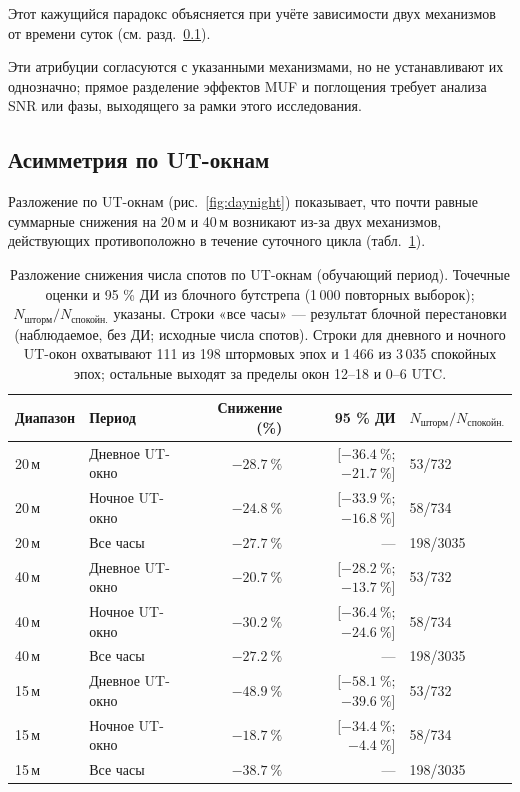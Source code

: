 \documentclass{agujournal2019}
\begin{document}
Этот кажущийся парадокс объясняется при учёте зависимости двух механизмов
от времени суток (см. разд.~\ref{sec:daynight}).

Эти атрибуции согласуются с указанными механизмами, но не устанавливают
их однозначно; прямое разделение эффектов MUF и поглощения требует анализа
SNR или фазы, выходящего за рамки этого исследования.

\subsection{Асимметрия по UT-окнам}
\label{sec:daynight}

Разложение по UT-окнам (рис.~\ref{fig:daynight}) показывает, что почти
равные суммарные снижения на 20\,м и 40\,м возникают из-за двух
механизмов, действующих противоположно в течение суточного цикла
(табл.~\ref{tab:daynight}).

\begin{table}[h]
	\centering
	\small
	\setlength{\tabcolsep}{4pt}
	\caption{Разложение снижения числа спотов по UT-окнам
		(обучающий период). Точечные оценки и 95 \% ДИ из
		блочного бутстрепа (1\,000 повторных выборок);
		$N_{\mbox{шторм}} / N_{\mbox{спокойн.}}$ указаны. Строки «все часы» —
		результат блочной перестановки (наблюдаемое, без ДИ; исходные числа спотов). Строки для дневного и ночного UT-окон охватывают 111 из 198 штормовых эпох и 1\,466
		из 3\,035 спокойных эпох; остальные выходят за пределы окон
		12--18 и 0--6 UTC.}
	\label{tab:daynight}
	\begin{tabular}{llrrl}
		\toprule
		Диапазон & Период & Снижение (\%) & 95 \% ДИ & $N_{\mbox{шторм}}/N_{\mbox{спокойн.}}$ \\
		\midrule
		20\,м & Дневное UT-окно    & $\SI{-28.7}{\percent}$ & [$\SI{-36.4}{\percent}$; $\SI{-21.7}{\percent}$] & 53/732  \\
		20\,м & Ночное UT-окно  & $\SI{-24.8}{\percent}$ & [$\SI{-33.9}{\percent}$; $\SI{-16.8}{\percent}$] & 58/734  \\
		20\,м & Все часы & $\SI{-27.7}{\percent}$ & --- & 198/3035 \\
		\midrule
		40\,м & Дневное UT-окно    & $\SI{-20.7}{\percent}$ & [$\SI{-28.2}{\percent}$; $\SI{-13.7}{\percent}$] & 53/732  \\
		40\,м & Ночное UT-окно  & $\SI{-30.2}{\percent}$ & [$\SI{-36.4}{\percent}$; $\SI{-24.6}{\percent}$] & 58/734  \\
		40\,м & Все часы & $\SI{-27.2}{\percent}$ & --- & 198/3035 \\
		\midrule
		15\,м & Дневное UT-окно    & $\SI{-48.9}{\percent}$ & [$\SI{-58.1}{\percent}$; $\SI{-39.6}{\percent}$] & 53/732  \\
		15\,м & Ночное UT-окно  & $\SI{-18.7}{\percent}$ & [$\SI{-34.4}{\percent}$; $\SI{-4.4}{\percent}$]  & 58/734  \\
		15\,м & Все часы & $\SI{-38.7}{\percent}$ & --- & 198/3035 \\
		\bottomrule
	\end{tabular}
\end{table}
\end{document}
